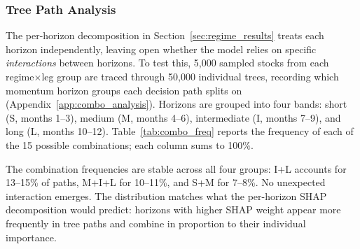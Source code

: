 

\subsubsection{Tree Path Analysis}\label{sec:tree_paths}

The per-horizon decomposition in Section~\ref{sec:regime_results} treats each horizon independently, leaving open whether the model relies on specific \emph{interactions} between horizons. To test this, 5{,}000 sampled stocks from each regime$\times$leg group are traced through 50{,}000 individual trees, recording which momentum horizon groups each decision path splits on (Appendix~\ref{app:combo_analysis}). Horizons are grouped into four bands: short (S, months 1--3), medium (M, months 4--6), intermediate (I, months 7--9), and long (L, months 10--12). Table~\ref{tab:combo_freq} reports the frequency of each of the 15 possible combinations; each column sums to 100\%.



The combination frequencies are stable across all four groups: I{+}L accounts for 13--15\% of paths, M{+}I{+}L for 10--11\%, and S{+}M for 7--8\%. No unexpected interaction emerges. The distribution matches what the per-horizon SHAP decomposition would predict: horizons with higher SHAP weight appear more frequently in tree paths and combine in proportion to their individual importance.


